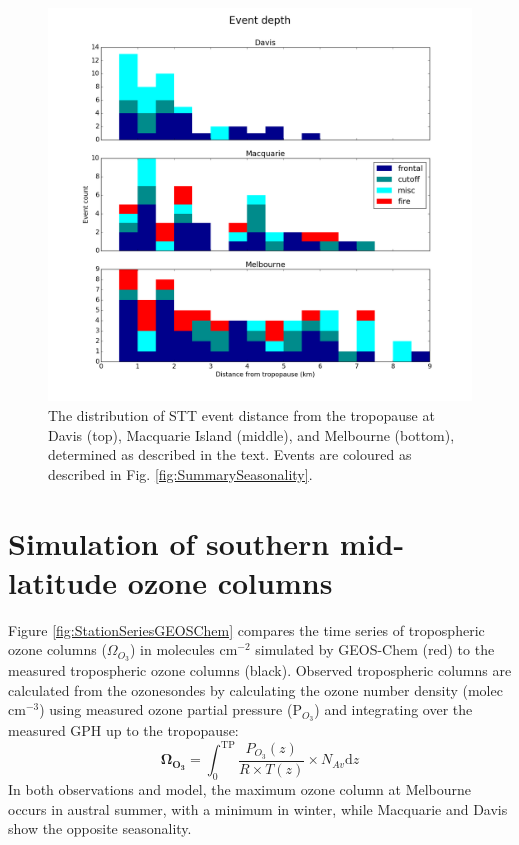 \documentclass{article}
\begin{document}
  \begin{figure}[!htbp]
    \begin{center}
    \includegraphics[width=0.99\columnwidth]{figures/summary_depth.png}
    \caption{The distribution of STT event distance from the tropopause at Davis (top), Macquarie Island (middle), and Melbourne (bottom), determined as described in the text.
    Events are coloured as described in Fig. \ref{fig:SummarySeasonality}.}
    \label{fig:SummaryTPDepths}
    \end{center}
  \end{figure}

\section{Simulation of southern mid-latitude ozone columns}
  
  Figure \ref{fig:StationSeriesGEOSChem} compares the time series of tropospheric ozone columns ($\Omega_{O_3}$) in molecules cm$^{-2}$ simulated by GEOS-Chem (red) to the measured tropospheric ozone columns (black).
  Observed tropospheric columns are calculated from the ozonesondes by calculating the ozone number density (molec cm$^{-3}$) using measured ozone partial pressure (P$_{O_3}$) and integrating over the measured GPH up to the tropopause:
  \begin{equation*}
    \mathbf{\Omega_{O_3}} = \int_{0}^{\text{TP}} \frac{P_{O_3}(z)}{R \times T(z)} \times N_{Av} \text{d}z
  \end{equation*}
  In both observations and model, the maximum ozone column at Melbourne occurs in austral summer, with a minimum in winter, while Macquarie and Davis show the opposite seasonality.
  
\end{document}
